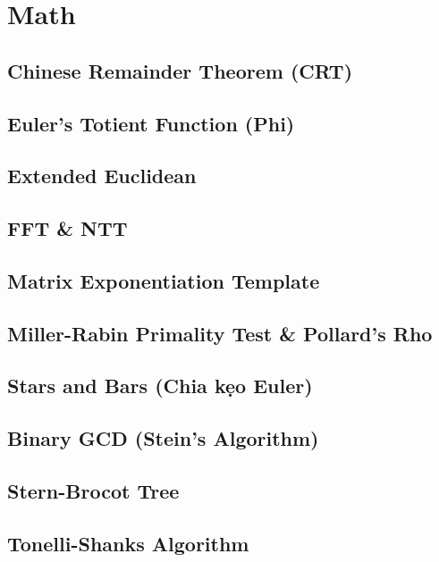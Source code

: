 \section{Math}
\subsection{Chinese Remainder Theorem (CRT)}

\subsection{Euler's Totient Function (Phi)}

\subsection{Extended Euclidean}

\subsection{FFT \& NTT}

\subsection{Matrix Exponentiation Template}

\subsection{Miller-Rabin Primality Test \& Pollard's Rho}

\subsection{Stars and Bars (Chia kẹo Euler)}

\subsection{Binary GCD (Stein's Algorithm)}

\subsection{Stern-Brocot Tree}

\subsection{Tonelli-Shanks Algorithm}

